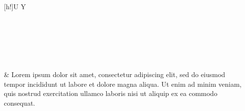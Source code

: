 \begin{xltabular}{\textwidth}[h!]{U Y}

     \hrulefill \\ \\ 
    \endfirsthead
    
     \hrulefill \\ \\
    \endhead
    
                &	Lorem ipsum dolor sit amet, consectetur adipiscing elit, sed do eiusmod tempor incididunt ut labore et dolore magna aliqua. Ut enim ad minim veniam, quis nostrud exercitation ullamco laboris nisi ut aliquip ex ea commodo consequat. \\
                        
\end{xltabular}